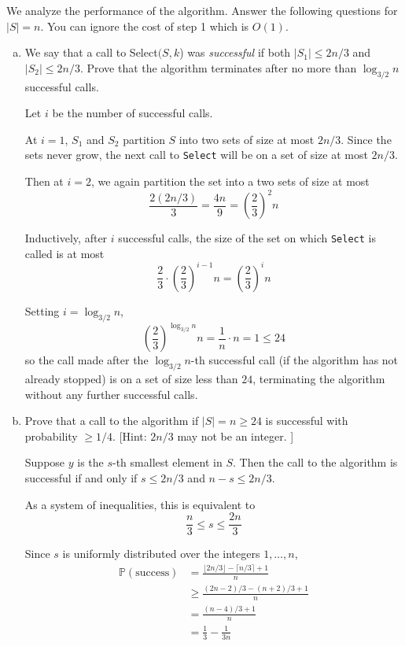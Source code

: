 \documentclass[12pt,letterpaper]{article}
\renewcommand{\P}{\mathbb{P}}
\renewcommand{\tt}[1]{\texttt{#1}}
\begin{document}
We analyze the performance of the algorithm. Answer the following questions for $|S|=n$. You can ignore the cost of step 1 which is $O(1)$. 
\begin{enumerate}[a.]
\item 
We say that a call to Select$(S,k$) was {\it successful} if both $|S_1|\leq 2n/3$ and $|S_2|\leq 2n/3$. Prove that 
the algorithm terminates after no more than $\log_{3/2} n$ successful calls.

\color{darkblue}
    Let $i$ be the number of successful calls. 

    At $i = 1$, $S_1$ and $S_2$ partition $S$ into two sets of size at most $2n/3$. Since the sets never grow, the next call to \tt{Select} will be on a set of size at most $2n/3$.

    Then at $i =2$, we again partition the set into a two sets of size at most 
    \[\frac{2(2n/3)}{3} = \frac{4n}{9} = \left(\frac{2}{3}\right)^2 n\]

    Inductively, after $i$ successful calls, the size of the set on which \tt{Select} is called is at most 
    \[\frac{2}{3} \cdot \left(\frac{2}{3}\right)^{i-1} n = \left(\frac{2}{3}\right)^i n\]

    Setting $i = \log_{3/2} n$, 
    \[\left(\frac{2}{3}\right)^{\log_{3/2} n} n = \frac{1}{n} \cdot n = 1 \leq 24\]
    so the call made after the $\log_{3/2} n$-th successful call (if the algorithm has not already stopped) is on a set of size less than $24$, terminating the algorithm without any further successful calls.
    
\color{black}


\item 
Prove that a call to the algorithm if $|S|=n\geq 24$ is successful with probability $\geq 1/4$. [Hint: $2n/3$ may not be an integer. ]

\color{darkblue}
    Suppose $y$ is the $s$-th smallest element in $S$. Then the call to the algorithm is successful if and only if $s \leq 2n/3$ and $n-s \leq 2n/3$.

    As a system of inequalities, this is equivalent to
    \[\frac{n}{3} \leq s \leq \frac{2n}{3}\]

    Since $s$ is uniformly distributed over the integers $1, \dots, n$, 
   \begin{align*}
     \P(\text{success}) &= \frac{\lfloor 2n/3 \rfloor - \lceil n/3 \rceil + 1}{n}\\ 
     &\geq \frac{(2n - 2)/3- (n + 2)/3 + 1}{n}\\ 
     &= \frac{(n -4)/3 + 1}{n}\\ 
     &= \frac{1}{3} - \frac{1}{3n} 
   \end{align*}


\end{enumerate}
\end{document}
